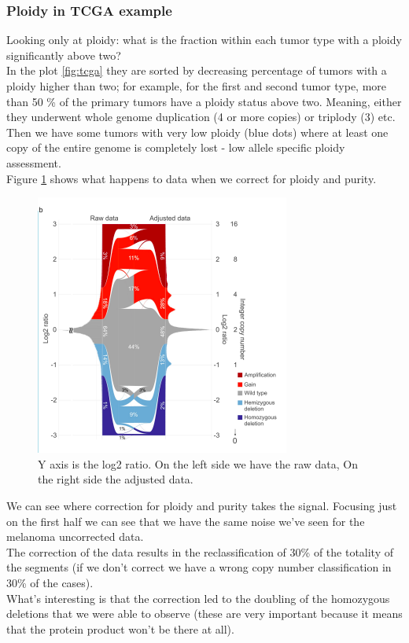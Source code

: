 \subsubsection{Ploidy in TCGA example}
Looking only at ploidy: what is the fraction within each tumor type with a ploidy significantly above two?
\\
In the plot \ref{fig:tcga} they are sorted by decreasing percentage of tumors with a ploidy higher than two; for example, for the first and second tumor type, more than 50
\% of the primary tumors have a ploidy status above two.
Meaning, either they underwent whole genome duplication (4 or more copies) or triplody (3) etc.
\\
Then we have some tumors with very low ploidy (blue dots) where at least one
copy of the entire genome is completely lost - low allele specific
ploidy assessment.
\\
Figure \ref{fig:ploidy_tcga} shows what happens to data when we correct for ploidy and purity.

\begin{figure}[H]
\centering
\includegraphics[width=0.5\linewidth]{image10.png}
\caption{Y axis is the log2 ratio. On the left side we have the raw data, On the right side the adjusted data.}
\label{fig:ploidy_tcga}
\end{figure}

We can see where correction for ploidy and purity takes the signal. Focusing just on the first half we can see that we have the same noise we've seen for the melanoma uncorrected data.
\\
The correction of the data results in the reclassification of 30\% of the
totality of the segments (if we don't correct we have a wrong copy number
classification in 30\% of the cases).
\\
What's interesting is that the correction led to the doubling of the homozygous
deletions that we were able to observe (these are very important because it
means that the protein product won't be there at all).

